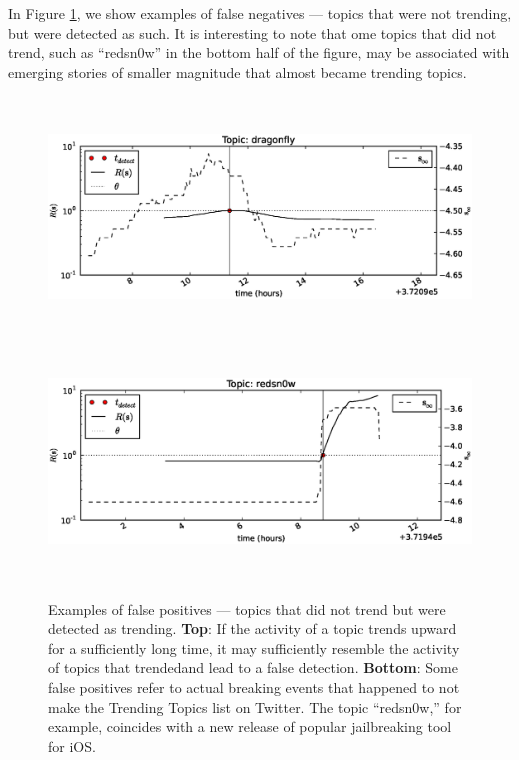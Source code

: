 In Figure \ref{fig:examples3}, we show examples of false negatives --- topics
that were not trending, but were detected as such. It is interesting to note
that ome topics that did not trend, such as ``redsn0w'' in the bottom half of
the figure, may be associated with emerging stories of smaller magnitude that
almost became trending topics.
\begin{figure}[!h]
\begin{center}
\includegraphics[height=2.5in]{../fig/final/detection_examples/fp/dragonfly.eps}
\includegraphics[height=2.5in]{../fig/final/detection_examples/fp/redsn0w.eps}
\end{center}
\caption{\label{fig:examples3} Examples of false positives --- topics that did
  not trend but were detected as trending. {\bf Top}: If the activity of a topic trends
  upward for a sufficiently long time, it may sufficiently resemble the activity
  of topics that trendedand lead to a false detection. {\bf Bottom}: Some false positives
  refer to actual breaking events that happened to not make the Trending Topics
  list on Twitter. The topic ``redsn0w,'' for example, coincides with a new
  release of popular jailbreaking tool for iOS.}
\end{figure}

